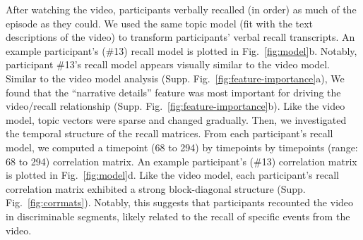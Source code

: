 \documentclass{article}
\begin{document}
After watching the video, participants verbally recalled (in order) as much of the episode as they could.  We used the same topic model (fit with the text descriptions of the video) to transform participants' verbal recall transcripts. An example participant's (\#13) recall model is plotted in Fig.~\ref{fig:model}b. Notably, participant \#13's recall model appears visually similar to the video model. Similar to the video model analysis (Supp. Fig.~\ref{fig:feature-importance}a), We found that the ``narrative details'' feature was most important for driving the video/recall relationship (Supp. Fig.~\ref{fig:feature-importance}b).  Like the video model, topic vectors were sparse and changed gradually.  Then, we investigated the temporal structure of the recall matrices. From each participant's recall model, we computed a timepoint (68 to 294) by timepoints by timepoints (range: 68 to 294) correlation matrix. An example participant's (\#13) correlation matrix is plotted in Fig.~\ref{fig:model}d. Like the video model, each participant's recall correlation matrix exhibited a strong block-diagonal structure (Supp. Fig.~\ref{fig:corrmats}). Notably, this suggests that participants recounted the video in discriminable segments, likely related to the recall of specific events from the video.
\end{document}
